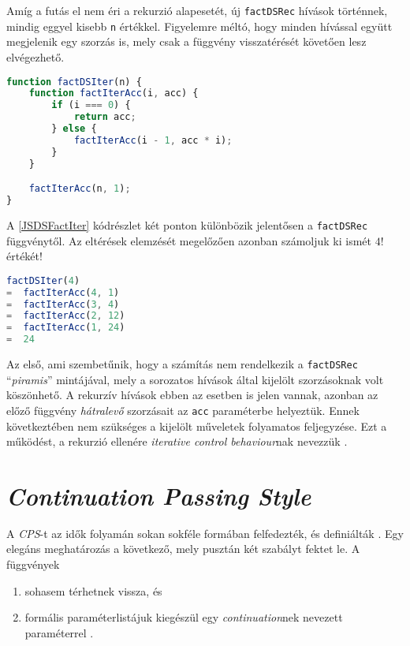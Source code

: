 Amíg a futás el nem éri a rekurzió alapesetét, új \texttt{factDSRec} hívások történnek, mindig eggyel kisebb \texttt{n} értékkel. Figyelemre méltó, hogy minden hívással együtt megjelenik egy szorzás is, mely csak a függvény visszatérését követően lesz elvégezhető.

\begin{lstlisting}[language=JavaScript, caption={\textit{Direct style} faktoriálist meghatározó függvény akkumulátorral}, captionpos=b, label=JSDSFactIter]
function factDSIter(n) {
    function factIterAcc(i, acc) {
        if (i === 0) {
            return acc;
        } else {
            factIterAcc(i - 1, acc * i);
        }
    }

    factIterAcc(n, 1);
}
\end{lstlisting}

A \ref{JSDSFactIter} kódrészlet két ponton különbözik jelentősen a \texttt{factDSRec} függvénytől. Az eltérések elemzését megelőzően azonban számoljuk ki ismét $4!$ értékét!

\begin{lstlisting}[language=JavaScript, caption={$4!$ kiszámítása \texttt{factDSIter} segítségével}, captionpos=b, numbers=none]
   factDSIter(4)
=  factIterAcc(4, 1)
=  factIterAcc(3, 4)
=  factIterAcc(2, 12)
=  factIterAcc(1, 24)
=  24
\end{lstlisting}

Az első, ami szembetűnik, hogy a számítás nem rendelkezik a \texttt{factDSRec} ``\textit{piramis}'' mintájával, mely a sorozatos hívások által kijelölt szorzásoknak volt köszönhető. A rekurzív hívások ebben az esetben is jelen vannak, azonban az előző függvény \textit{hátralevő} szorzásait az \texttt{acc} paraméterbe helyeztük. Ennek következtében nem szükséges a kijelölt műveletek folyamatos feljegyzése. Ezt a működést, a rekurzió ellenére \textit{iterative control behaviour}nak nevezzük .

\section{\textit{Continuation Passing Style}}

A \textit{CPS}-t az idők folyamán sokan sokféle formában felfedezték, és definiálták \cite{Reynolds1993}. Egy elegáns meghatározás a következő, mely pusztán két szabályt fektet le. A függvények

\begin{enumerate}
    \item sohasem térhetnek vissza, és
    \item formális paraméterlistájuk kiegészül egy \textit{continuation}nek nevezett paraméterrel \cite{MightCPS}.
\end{enumerate}


